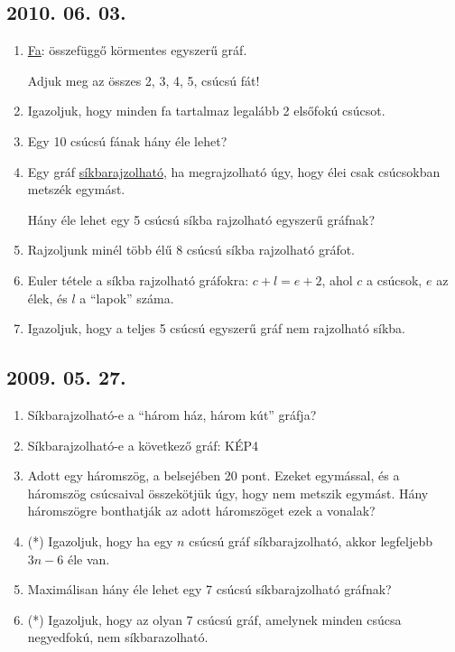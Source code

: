 \subsection*{2010. 06. 03.}
\begin{enumerate}
\item \underline{Fa}: összefüggő körmentes egyszerű gráf.

Adjuk meg az összes 2, 3, 4, 5, csúcsú fát!
\item Igazoljuk, hogy minden fa tartalmaz legalább 2 elsőfokú csúcsot.
\item Egy 10 csúcsú fának hány éle lehet?
\item Egy gráf \underline{síkbarajzolható}, ha megrajzolható úgy, hogy élei csak csúcsokban metszék egymást.

Hány éle lehet egy 5 csúcsú síkba rajzolható egyszerű gráfnak?
\item Rajzoljunk minél több élű 8 csúcsú síkba rajzolható gráfot.
\item Euler tétele a síkba rajzolható gráfokra: $c+l=e+2$,
ahol $c$ a csúcsok, $e$ az élek, és $l$ a “lapok” száma.
\item Igazoljuk, hogy a teljes 5 csúcsú egyszerű gráf nem rajzolható síkba.
\end{enumerate}


\subsection*{2009. 05. 27.}
\begin{enumerate}
\item Síkbarajzolható-e a “három ház, három kút” gráfja?
\item Síkbarajzolható-e a következő gráf: KÉP4
\item Adott egy háromszög, a belsejében 20 pont. Ezeket egymással, és a háromszög csúcsaival összekötjük úgy, hogy nem metszik egymást. Hány háromszögre bonthatják az adott háromszöget ezek a vonalak?
\item (*) Igazoljuk, hogy ha egy $n$ csúcsú gráf síkbarajzolható, akkor legfeljebb $3n-6$ éle van.
\item Maximálisan hány éle lehet egy 7 csúcsú síkbarajzolható gráfnak?
\item (*) Igazoljuk, hogy az olyan 7 csúcsú gráf, amelynek minden csúcsa negyedfokú, nem síkbarazolható.
\end{enumerate}


